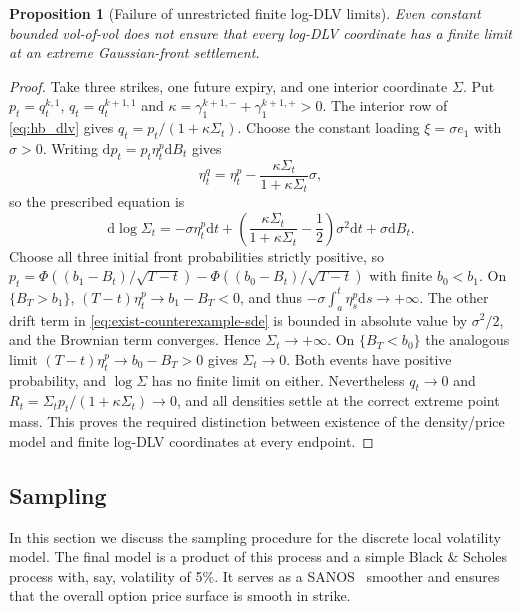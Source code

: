 \documentclass[11pt]{article}
\newcommand{\dd}{\mathrm d}
\theoremstyle{plain}
\newtheorem{proposition}[theorem]{Proposition}
\theoremstyle{definition}
\theoremstyle{remark}
\begin{document}
\begin{proposition}[Failure of unrestricted finite log-DLV limits]
\label{prop:exist-boundary-counterexample}
Even constant bounded vol-of-vol does not ensure that every log-DLV
coordinate has a finite limit at an extreme Gaussian-front settlement.
\end{proposition}
\begin{proof}
Take three strikes, one future expiry, and one interior coordinate
$\Sigma$. Put $p_t=q_t^{k,1}$, $q_t=q_t^{k+1,1}$ and
$\kappa=\gamma_1^{k+1,-}+\gamma_1^{k+1,+}>0$.
The interior row of \eqref{eq:hb_dlv} gives
$q_t=p_t/(1+\kappa\Sigma_t)$.
Choose the constant loading $\xi=\sigma e_1$ with $\sigma>0$.
Writing $\dd p_t=p_t\eta_t^p\dd B_t$ gives
\[
 \eta_t^q=\eta_t^p-\frac{\kappa\Sigma_t}{1+\kappa\Sigma_t}\sigma,
\]
so the prescribed equation is
\begin{equation}\label{eq:exist-counterexample-sde}
 \dd\log\Sigma_t
 =-\sigma\eta_t^p\dd t
   +\left(\frac{\kappa\Sigma_t}{1+\kappa\Sigma_t}-\frac12\right)
      \sigma^2\dd t+\sigma\dd B_t.
\end{equation}
Choose all three initial front probabilities strictly positive, so
$p_t=\Phi((b_1-B_t)/\sqrt{T-t})-\Phi((b_0-B_t)/\sqrt{T-t})$
with finite $b_0<b_1$.
On $\{B_T>b_1\}$,
$(T-t)\eta_t^p\to b_1-B_T<0$, and thus
$-\sigma\int_a^t\eta_s^p\dd s\to+\infty$.
The other drift term in \eqref{eq:exist-counterexample-sde} is bounded
in absolute value by $\sigma^2/2$, and the Brownian term converges.
Hence $\Sigma_t\to+\infty$. On $\{B_T<b_0\}$ the analogous limit
$(T-t)\eta_t^p\to b_0-B_T>0$ gives $\Sigma_t\to0$.
Both events have positive probability, and $\log\Sigma$ has no finite
limit on either. Nevertheless $q_t\to0$ and
$R_t=\Sigma_t p_t/(1+\kappa\Sigma_t)\to0$, and all densities settle
at the correct extreme point mass. This proves the required distinction
between existence of the density/price model and finite log-DLV
coordinates at every endpoint.
\end{proof}

\subsection{Sampling}
\label{sec:sampling}

In this section we discuss the sampling procedure for the discrete local volatility model. The final model is a product of this 
process and a simple Black \& Scholes process with, say, volatility of 5\%. It serves as a SANOS~\cite{SANOS2026} smoother and ensures
that the overall option price surface is smooth in strike.
\end{document}
